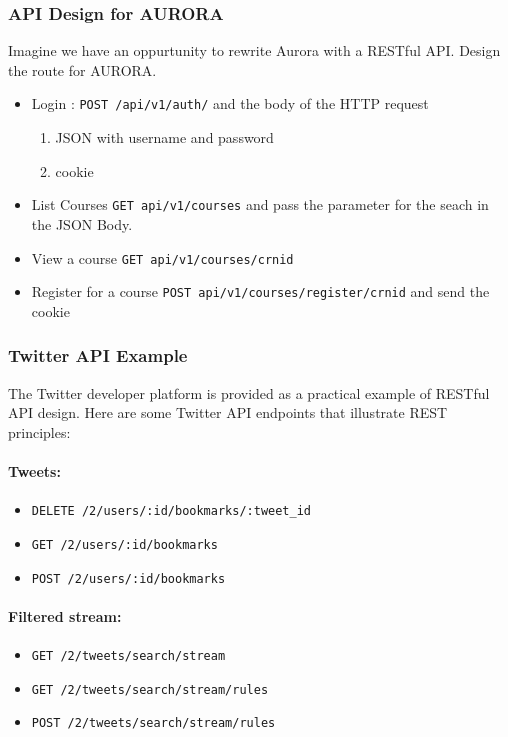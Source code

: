 \subsubsection{API Design for AURORA}
Imagine we have an oppurtunity to rewrite Aurora with a RESTful API.  Design the route for AURORA. 
\begin{itemize}[noitemsep]
	\item Login : \texttt{POST /api/v1/auth/} and the body of the HTTP request
		\begin{enumerate} [label=\alph*., noitemsep] %
            \item JSON with username and password
            \item cookie
        \end{enumerate}
	\item List Courses \texttt{GET api/v1/courses} and pass the parameter for the seach in the JSON Body.
	\item View a course \texttt{GET api/v1/courses/crnid}
	\item Register for a course \texttt{POST api/v1/courses/register/crnid} and send the cookie 
\end{itemize}

\subsubsection{Twitter API Example}

The Twitter developer platform is provided as a practical example of RESTful API design. Here are some Twitter API endpoints that illustrate REST principles:

\paragraph{Tweets:}
\begin{itemize}[noitemsep, topsep=4pt]
    \item \texttt{DELETE /2/users/:id/bookmarks/:tweet\_id}
    \item \texttt{GET /2/users/:id/bookmarks}
    \item \texttt{POST /2/users/:id/bookmarks}
\end{itemize}

\paragraph{Filtered stream:}
\begin{itemize}[noitemsep, topsep=4pt]
    \item \texttt{GET /2/tweets/search/stream}
    \item \texttt{GET /2/tweets/search/stream/rules}
    \item \texttt{POST /2/tweets/search/stream/rules}
\end{itemize}

